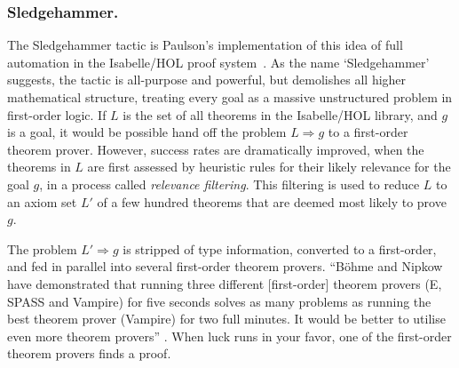 \documentclass{llncs}
\begin{document}

\subsubsection{Sledgehammer.}

The Sledgehammer tactic is Paulson's implementation of this idea of full automation in
the Isabelle/HOL proof system~\cite{Paar}.  As the name `Sledgehammer' suggests,
the tactic is all-purpose and powerful, but demolishes all higher
mathematical structure, treating every goal as a massive unstructured
problem in first-order logic.  If $L$ is the set of all theorems in
the Isabelle/HOL library, and $g$ is a goal, it would be possible hand
off the problem $L\Longrightarrow g$ to a first-order theorem
prover.  However, success rates are dramatically improved, when the
theorems in $L$ are first assessed by heuristic rules for their likely
relevance for the goal $g$, in a process called {\it relevance
  filtering}. 
This filtering is used to reduce $L$ to an axiom set $L'$ of a
few hundred theorems that are deemed most likely to prove $g$.

The problem $L'\Longrightarrow g$ is stripped
of type information, converted to a first-order, and fed
 in parallel into several first-order theorem provers.  
 ``B\"ohme and Nipkow \cite{Boehme-Nipkow-IJCAR10} have demonstrated that
running three different [first-order] theorem provers (E, SPASS and
Vampire) for five seconds solves as many problems as running the
best theorem prover (Vampire) for two full minutes.  It would be
better to utilise even more theorem provers'' 
\cite{Paar}.
When luck runs in your favor, one of the first-order theorem provers finds
a proof.
\end{document}
